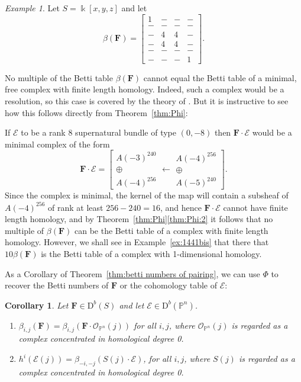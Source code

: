 \documentclass[12pt]{amsart}
\newtheorem{cor}[lemma]{Corollary}
\theoremstyle{definition}
\theoremstyle{remark}
\newtheorem{example}[lemma]{Example}
\newcommand{\kk}{\Bbbk}
\newcommand{\PP}{\mathbb{P}}
\newcommand{\cO}{\mathcal{O}}
\newcommand{\cE}{\mathcal{E}}
\newcommand{\FF}{\mathbf{F}}
\newcommand{\DD}{\mathrm{D}}
\renewcommand{\P}{{\mathbb P}}
\begin{document}
\begin{example}\label{ex:1441}
Let $S=\kk[x,y,z]$ and let
\begin{equation}\label{eqn:intro ex}
\beta(\FF)=\begin{bmatrix} 1&-&-&-\\ -&-&-&-\\-&4&4&-\\-&4&4&-\\-&-&-&-\\-&-&-&1 \end{bmatrix}.
\end{equation}

No multiple of the Betti table $\beta(\FF)$ cannot equal the Betti table of a minimal, free complex with finite length homology. Indeed, such a complex would be a resolution,  so this case is covered by the theory of \cite{Eis-Schr}. But it is instructive to see how this follows directly from
Theorem~\ref{thm:Phi}:

If $\cE$ to be a rank $8$ supernatural bundle of type $(0,-8)$ then 
$\FF\cdot \cE$ would be a minimal complex of the form
\[
\FF\cdot \cE=\left[ \begin{matrix}A(-3)^{240}\\ \oplus \\A(-4)^{256}\end{matrix} \longleftarrow \begin{matrix}A(-4)^{256}\\\oplus \\ A(-5)^{240}\end{matrix}\right].
\]
Since the complex is minimal, the kernel of the map will contain a subsheaf of $A(-4)^{256}$ of rank at least $256-240=16$, and hence $\FF\cdot \cE$ cannot have finite length homology, and  by Theorem~\ref{thm:Phi}\eqref{thm:Phi:2} it follows that no multiple of $\beta(\FF)$ can be the Betti table of a complex with finite length homology. However, we shall see in Example~\ref{ex:1441bis} that 
there that $10\beta(\FF)$ is the Betti table of a complex with 1-dimensional homology.
\end{example}

As a Corollary of Theorem~\ref{thm:betti numbers of pairing}, we can use $\Phi$ to recover the Betti numbers of $\FF$  or the cohomology
table of $\cE$:
\begin{cor} Let $\FF\in \DD^b(S)$ and let $\cE\in \DD^b(\PP^n)$.
\begin{enumerate}
\item 
 $\beta_{i,j}(\FF) = \beta_{i,j}(\FF\cdot \cO_{\P^{n}}(j))$ for all $i,j$, where $\cO_{\PP^n}(j)$ is regarded as a complex concentrated in homological degree 0.
\item $h^{i}(\cE(j)) = \beta_{-i,-j}(S(j)\cdot \cE)$, for all $i,j$, where $S(j)$ is regarded as a complex concentrated in homological degree 0.
\end{enumerate}
\end{cor}
\end{document}
